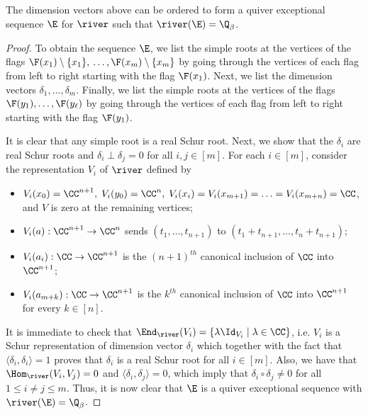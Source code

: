 \begin{prop} \label{prop-embed-qes} The dimension vectors above can be ordered to form a quiver exceptional sequence $\E$ for $\river$ such that $\river(\E) = \Q_{\beta}$.
\end{prop} 
\begin{proof} To obtain the sequence $\E$, we list the simple roots at the vertices of the flags $\F(x_1)\setminus \{x_1\},$ $\ldots,\F(x_m) \setminus \{x_m\}$ by going through the vertices of each flag from left to right starting with the flag $\F(x_1)$. Next, we list the dimension vectors $\delta_1, \ldots, \delta_m$. Finally,  we list the simple roots at the vertices of the flags $\F(y_1), \ldots, \F(y_\ell)$ by going through the vertices of each flag from left to right starting with the flag $\F(y_1)$. 

It is clear that any simple root is a real Schur root. Next, we show that the $\delta_i$ are real Schur roots and $\delta_i \perp \delta_j=0$ for all $i,j \in [m]$. For each $i \in [m]$,  consider the representation $V_i$ of $\river$ defined by 
\begin{itemize}
\item $V_i(x_0) = \CC^{n+1}, \; V_i(y_0) = \CC^n, \; V_i(x_i) =V_i(x_{m+1})= \ldots = V_i(x_{m+n}) = \CC$, and $V$ is zero at the remaining vertices;
\item $V_i(a): \CC^{n+1} \to \CC^n$ sends $(t_1,\ldots, t_{n+1})$ to $(t_1+t_{n+1},\ldots, t_n+t_{n+1})$;
\item $V_i(a_i): \CC \to \CC^{n+1}$ is the $(n+1)^{th}$ canonical inclusion of $\CC$ into $\CC^{n+1}$;
\item $V_i(a_{m+k}):\CC \to \CC^{n+1}$ is the $k^{th}$ canonical inclusion of $\CC$ into $\CC^{n+1}$ for every $k \in [n]$.
\end{itemize}

It is immediate to check that $\End_{\river}(V_i) = \{\lambda \Id_{V_i} \mid \lambda \in \CC\}$, i.e. $V_i$ is a Schur representation of dimension vector $\delta_i$ which together with the fact that $\langle \delta_i, \delta_i \rangle =1$ proves that $\delta_i$ is a real Schur root for all $i \in [m]$. Also, we have that $\Hom_{\river}(V_i,V_j) = 0$ and $\langle \delta_i, \delta_j \rangle = 0$, which imply that $\delta_i \circ \delta_j\neq 0$ for all $1 \leq i \neq j \leq m$. Thus, it is now clear that $\E$ is a quiver exceptional sequence with $\river(\E) = \Q_\beta$.
\end{proof} 


